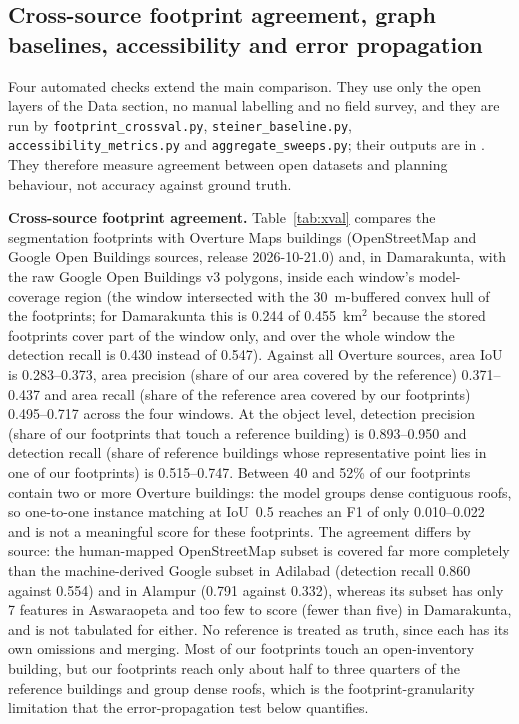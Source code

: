 \documentclass[10pt,a4paper,twocolumn]{article}
\begin{document}
\subsection{Cross-source footprint agreement, graph baselines, accessibility and error propagation}\label{sec:res4}
Four automated checks extend the main comparison. They use only the open layers of the Data section, no manual labelling and no field survey, and they are run by \texttt{footprint\_crossval.py}, \texttt{steiner\_baseline.py}, \texttt{accessibility\_metrics.py} and \texttt{aggregate\_sweeps.py}; their outputs are in . They therefore measure agreement between open datasets and planning behaviour, not accuracy against ground truth.

\textbf{Cross-source footprint agreement.} Table~\ref{tab:xval} compares the segmentation footprints with Overture Maps buildings (OpenStreetMap and Google Open Buildings sources, release 2026-10-21.0) and, in Damarakunta, with the raw Google Open Buildings v3 polygons, inside each window's model-coverage region (the window intersected with the 30~m-buffered convex hull of the footprints; for Damarakunta this is 0.244 of 0.455~km$^2$ because the stored footprints cover part of the window only, and over the whole window the detection recall is 0.430 instead of 0.547). Against all Overture sources, area IoU is 0.283--0.373, area precision (share of our area covered by the reference) 0.371--0.437 and area recall (share of the reference area covered by our footprints) 0.495--0.717 across the four windows. At the object level, detection precision (share of our footprints that touch a reference building) is 0.893--0.950 and detection recall (share of reference buildings whose representative point lies in one of our footprints) is 0.515--0.747. Between 40 and 52\% of our footprints contain two or more Overture buildings: the model groups dense contiguous roofs, so one-to-one instance matching at IoU~0.5 reaches an F1 of only 0.010--0.022 and is not a meaningful score for these footprints. The agreement differs by source: the human-mapped OpenStreetMap subset is covered far more completely than the machine-derived Google subset in Adilabad (detection recall 0.860 against 0.554) and in Alampur (0.791 against 0.332), whereas its subset has only 7 features in Aswaraopeta and too few to score (fewer than five) in Damarakunta, and is not tabulated for either. No reference is treated as truth, since each has its own omissions and merging. Most of our footprints touch an open-inventory building, but our footprints reach only about half to three quarters of the reference buildings and group dense roofs, which is the footprint-granularity limitation that the error-propagation test below quantifies.
\end{document}
